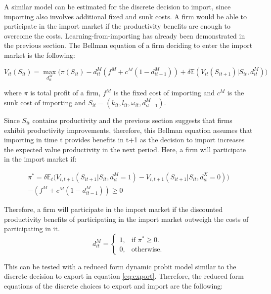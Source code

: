 \documentclass[12pt]{article}
\begin{document}
A similar model can be estimated for the discrete decision to import,
since importing also involves additional fixed and sunk costs. A firm
would be able to participate in the import market if the productivity
benefits are enough to overcome the costs. Learning-from-importing has already been
demonstrated in the previous section. The Bellman equation of a firm
deciding to enter the import market is the following: 

\begin{equation}
V_{it}(S_{it})=  \underset{d_{it}^{M}}{\max}\Big(\pi(S_{it}) - d_{it}^{M}( f^{M} +
c^{M}(1-d_{it-1}^{M}))  + \delta \mathbb{E} (V_{it}(S_{it+1})|S_{it}, d_{it}^{M})\Big)
\end{equation}

where $\pi$ is total profit of a firm, $f^{M}$ is the fixed cost of
importing and  $c^{M}$ is the sunk cost of importing and  $S_{it} = (k_{it}, l_{it}, \omega_{it},
d_{it-1}^{M})$. 

Since $S_{it}$ contains productivity and the previous section suggests
that firms exhibit productivity improvements,  therefore,  this Bellman equation assumes that
importing in time t provides benefits in t+1 as the decision to
import increases the expected value productivity in the next period. Here, a firm will participate in the
import market if:

\begin{equation}
\begin{aligned}
\pi^{*}= 
\delta \mathbb{E}_{t}\Big(V_{i,t+1}(S_{it+1}|S_{it},d_{it}^{M}=1) -
V_{i,t+1}(S_{it+1}|S_{it},d_{it}^{X}=0) \Big) \\-  
(f^{M} + c^{M}(1-d_{it-1}^{M})) \geq 0
\end{aligned}
\end{equation}

Therefore, a firm will participate in the import market if the
discounted productivity benefits of participating in the
import market outweigh the costs of participating in it.
\begin{equation}
  d_{it}^{M}=\begin{cases}
   1 , & \text{if $\pi^{*} \geq 0 $}.\\
   0 , & \text{otherwise}.
  \end{cases}
\end{equation}


This can be tested with a reduced form dynamic probit model similar to
the discrete decision to export in equation \ref{eq:export}.  Therefore, the reduced form equations of
the discrete choices to export and import are the following:
\end{document}
